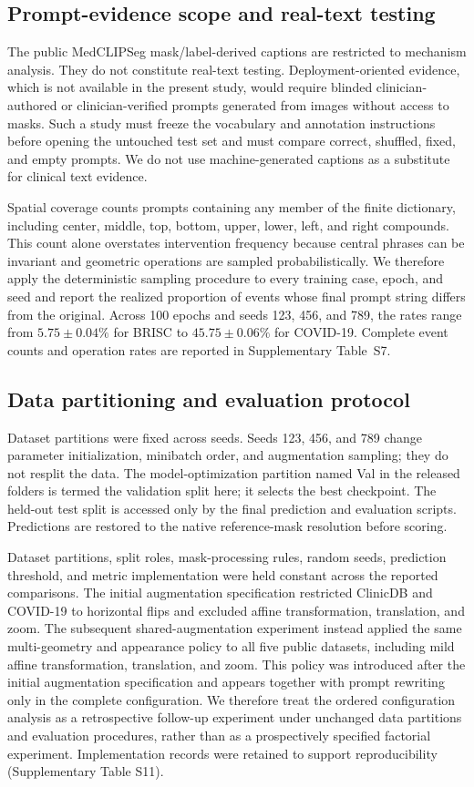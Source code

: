 \subsection{Prompt-evidence scope and real-text testing}
The public MedCLIPSeg mask/label-derived captions are restricted to mechanism
analysis. They do not constitute real-text testing. Deployment-oriented
evidence, which is not available in the present study, would require blinded
clinician-authored or clinician-verified prompts generated from images without
access to masks. Such a study must freeze the vocabulary and annotation
instructions before opening the untouched test set and must compare correct,
shuffled, fixed, and empty prompts. We do not use machine-generated captions as
a substitute for clinical text evidence.

Spatial coverage counts prompts containing any member of the finite dictionary,
including center, middle, top, bottom, upper, lower, left, and right compounds.
This count alone overstates intervention frequency because central phrases can be
invariant and geometric operations are sampled probabilistically. We therefore
apply the deterministic sampling procedure to every training case, epoch, and seed
and report the realized proportion of events whose final prompt string differs
from the original. Across 100 epochs and seeds 123, 456, and 789, the rates
range from $5.75\pm0.04\%$ for BRISC to $45.75\pm0.06\%$ for COVID-19.
Complete event counts and operation rates are reported in Supplementary
Table~S7.

\subsection{Data partitioning and evaluation protocol}
Dataset partitions were fixed across seeds. Seeds 123, 456, and 789 change
parameter initialization, minibatch order, and augmentation sampling; they do
not resplit the data. The model-optimization partition named Val in the released
folders is termed the validation split here; it selects the best checkpoint. The held-out test split
is accessed only by the final prediction and evaluation scripts. Predictions are
restored to the native reference-mask resolution before scoring.

Dataset partitions, split roles, mask-processing rules, random seeds, prediction
threshold, and metric implementation were held constant across the reported
comparisons. The initial augmentation specification restricted ClinicDB and
COVID-19 to horizontal flips and excluded affine transformation, translation,
and zoom. The subsequent shared-augmentation experiment instead applied the same
multi-geometry and appearance policy to all five public datasets, including mild
affine transformation, translation, and zoom. This policy was introduced after
the initial augmentation specification and appears together with prompt rewriting
only in the complete configuration. We therefore treat the ordered configuration
analysis as a retrospective follow-up experiment under unchanged data partitions
and evaluation procedures, rather than as a prospectively specified factorial
experiment. Implementation records were retained to support reproducibility
(Supplementary Table S11).

